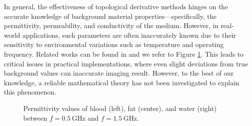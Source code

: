 \documentclass[a4,10pt]{article}
\theoremstyle{plain}
\theoremstyle{remark}
\begin{document}
In general, the effectiveness of topological derivative methods hinges on the accurate knowledge of background material properties—specifically, the permittivity, permeability, and conductivity of the medium. However, in real-world applications, such parameters are often inaccurately known due to their sensitivity to environmental variations such as temperature and operating frequency. Related works can be found in \cite{BWFWH,C8,K7,MPFLP,P-Book} and we refer to Figure \ref{Parameters}. This leads to critical issues in practical implementations, where even slight deviations from true background values can inaccurate imaging result. However, to the best of our knowledge, a reliable mathematical theory has not been investigated to explain this phenomenon.

\begin{figure}[h]
\begin{center}
\caption{\label{Parameters}Permittivity values of blood (left), fat (center), and water (right) between $f=\SI{0.5}{\giga\hertz}$ and $f=\SI{1.5}{\giga\hertz}$.}
\end{center}
\end{figure}
\end{document}
